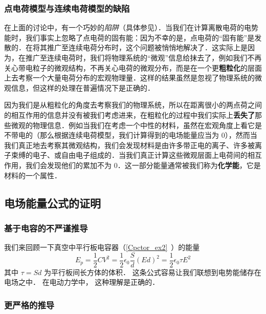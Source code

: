 \subsubsection{点电荷模型与连续电荷模型的缺陷}
在上面的讨论中，有一个巧妙的\textsl{陷阱}（具体参见\cite{GriffE}）．当我们在计算离散电荷的电势能时，我们事实上忽略了点电荷的固有能：因为不幸的是，点电荷的“固有能”是发散的．在将其推广至连续电荷分布时，这个问题被悄悄地解决了．这实际上是因为，在推广至连续电荷时，我们将物理系统的“微观”信息给抹去了，例如我们不再关心带电粒子的微观结构，不再关心电荷的微观分布，而是在一个更\textbf{粗粒化}的层面上去考察一个大量电荷分布的宏观物理量．这样的结果虽然是忽视了物理系统的微观信息，但这样的处理在普遍情况下是正确的．

因为我们是从粗粒化的角度去考察我们的物理系统，所以在距离很小的两点荷之间的相互作用的信息并没有被我们考虑进来，在粗粒化的过程中我们实际上\textbf{丢失了}那些微观的物理信息．例如当我们在考虑一个中性的材料，虽然在宏观角度上看它是不带电的（那么根据连续电荷模型，我们计算得到的电场能量应当为 $0$），然而当我们真正地去考察其微观结构，我们会发现材料是由许多带正电的离子、许多被离子束缚的电子、或自由电子组成的．当我们真正计算这些微观层面上电荷间的相互作用，我们会发现他们的累加不为 $0$．这一部分能量通常被我们称为\textbf{化学能}，它是材料的一个属性．



\subsection{电场能量公式的证明}

\subsubsection{基于电容的不严谨推导}
我们来回顾一下真空中平行板电容器（\autoref{Cpctor_ex2}~）的能量
\begin{equation}
E_p = \frac12 CV^2 = \frac12 \epsilon_0 \frac Sd (Ed)^2 = \frac 12 \epsilon_0 \tau E^2
\end{equation}
其中 $\tau = Sd$ 为平行板间长方体的体积． 这条公式容易让我们联想到电势能储存在电场之中． 在电动力学中， 这种理解是正确的．

\subsubsection{更严格的推导}

